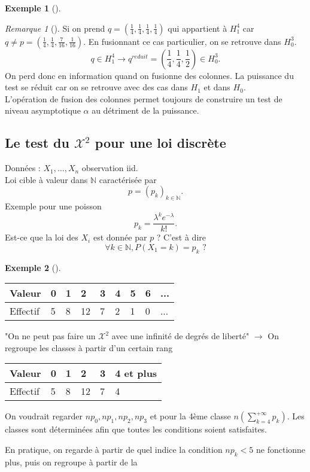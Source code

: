 \documentclass{article}
\theoremstyle{plain}%
\theoremstyle{definition}
\newtheorem{exmp}{Exemple}[section]
\theoremstyle{remark}
\newtheorem*{rem}{Remarque}
\begin{document}
\begin{exmp}[]
    \begin{rem}[]
        Si on prend $ q = (\frac{1}{4}, \frac{1}{4}, \frac{1}{4}, \frac{1}{4}) $ qui appartient à $ H_1^4 $ car $ q \neq p = (\frac{1}{4}, \frac{1}{4}, \frac{7}{16}, \frac{1}{16}) $. En fusionnant ce cas particulier, on se retrouve dans $ H_0^3 $.
        \[
            q \in H_1^4 \to q^{reduit} = (\frac{1}{4}, \frac{1}{4}, \frac{1}{2}) \in H_0^3
        .\]
        On perd donc en information quand on fusionne des colonnes. La puissance du test se réduit car on se retrouve avec des cas dans $ H_1 $ et dans $ H_0 $.\\
        L'opération de fusion des colonnes permet toujours de construire un test de niveau asymptotique $ \alpha  $ au détriment de la puissance.
    \end{rem}    
\end{exmp}

\subsection{Le test du $ \mathcal{X}^2 $ pour une loi discrète}
Données : $ X_1, \dots, X_n $ observation iid. \\
Loi cible à valeur dans $ \mathbb{N} $ caractérisée par 
\[
    p = (p_k)_{k \in \mathbb{N}}
.\]
Exemple pour une poisson 
\[
    p_k = \frac{\lambda^k e^{-\lambda }}{k!}
.\]
Est-ce que la loi des $ X_i $ est donnée par $ p $ ?  C'est à dire 
\[
    \forall k \in \mathbb{N}, P(X_1 = k) = p_k \text{ ?}
\]

\begin{exmp}[]
    \begin{table}[!ht]
        \centering
        \begin{tabular}{|l|l|l|l|l|l|l|l|l|}
        \hline
            Valeur & 0 & 1 & 2 & 3 & 4 & 5 & 6 & ... \\ \hline
            Effectif & 5 & 8 & 12 & 7 & 2 & 1 & 0 & ... \\ \hline
        \end{tabular}
    \end{table}
    "On ne peut pas faire un $ \mathcal{X}^2 $ avec une infinité de degrés de liberté" $\rightarrow$ On regroupe les classes à partir d'un certain rang
    \begin{table}[!ht]
        \centering
        \begin{tabular}{|l|l|l|l|l|l|}
        \hline
            Valeur & 0 & 1 & 2 & 3 & 4 et plus \\ \hline
            Effectif & 5 & 8 & 12 & 7 & 4 \\ \hline
        \end{tabular}
    \end{table}
    On voudrait regarder $ np_0, np_1, np_2, np_3 $ et pour la 4ème classe $ n(\sum_{k=4}^{+ \infty } p_k) $. Les classes sont déterminées afin que toutes les conditions soient satisfaites. 

    En pratique, on regarde à partir de quel indice la condition $ np_k < 5 $ ne fonctionne plus, puis on regroupe à partir de la 
\end{exmp}
\end{document}

